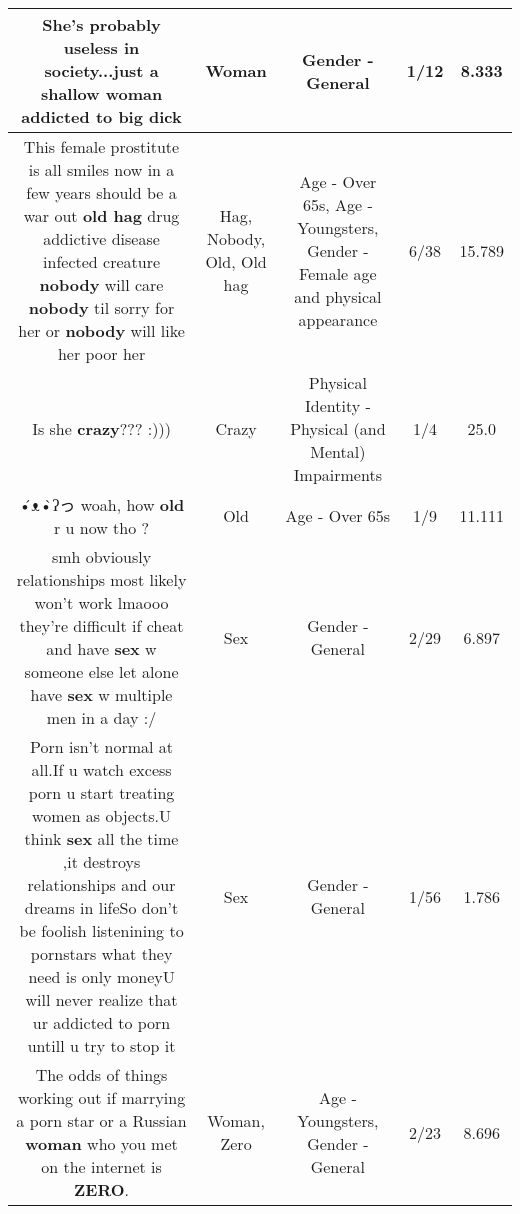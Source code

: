 \documentclass[11pt]{article}
\newlength\mylength
\begin{document}
\begin{center}
\begin{longtable}{|C{.65\mylength}|C{.30\mylength}|C{.12\mylength}|C{.12\mylength}|C{.12\mylength}|}
  \small She's probably useless in society...just a shallow \textbf{woman} addicted to big dick\normalsize   & Woman & Gender - General & 1/12 & 8.333 \\  \hline
  \small This female prostitute is all smiles now in a few years should be a war out \textbf{o\textbf{ld} h\textbf{ag}} drug addictive disease infected creature \textbf{nobody} will care \textbf{nobody} til sorry for her or \textbf{nobody} will like her poor her\normalsize   & Hag, Nobody, Old, Old hag & Age - Over 65s, Age - Youngsters, Gender - Female age and physical appearance & 6/38 & 15.789 \\  \hline
  \small Is she \textbf{crazy}??? :)))\normalsize   & Crazy & Physical Identity - Physical (and Mental) Impairments & 1/4 & 25.0 \\  \hline
  \small {}•́ᴥ•̀ʔっ woah, how \textbf{old} r u now tho ?\normalsize   & Old & Age - Over 65s & 1/9 & 11.111 \\  \hline
  \small smh obviously relationships most likely won't work lmaooo they're difficult if cheat and have \textbf{sex} w someone else let alone have \textbf{sex} w multiple men in a day :/\normalsize   & Sex & Gender - General & 2/29 & 6.897 \\  \hline
  \small Porn isn't normal at all.If u watch excess porn u start treating women as objects.U think \textbf{sex} all the time ,it  destroys relationships and our dreams in lifeSo don't be foolish listenining to pornstars what they need is only moneyU will never realize that ur addicted to porn untill u try to stop it\normalsize   & Sex & Gender - General & 1/56 & 1.786 \\  \hline
  \small The odds of things working out if marrying a porn star or a Russian \textbf{woman} who you met on the internet is \textbf{ZERO}.\normalsize   & Woman, Zero & Age - Youngsters, Gender - General & 2/23 & 8.696 \\  \hline

\end{longtable}
\end{center}
\end{document}

